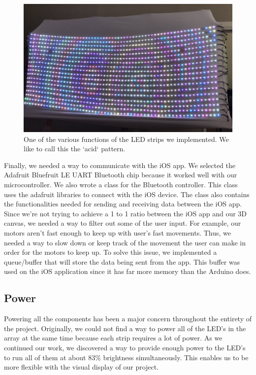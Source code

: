 \documentclass[11pt]{IEEEtran}
\begin{document}
\begin{figure}[H]
  \centering
  \includegraphics[width=\columnwidth]{acid.png}
  \caption{One of the various functions of the LED strips we implemented. We like to call this the `acid` pattern.}
  \label{fig:acid}
\end{figure}

Finally, we needed a way to communicate with the iOS app. We selected the Adafruit Bluefruit LE UART Bluetooth chip because it worked well with our microcontroller. We also wrote a class for the Bluetooth controller. This class uses the adafruit libraries to connect with the iOS device. The class also contains the functionalities needed for sending and receiving data between the iOS app. Since we’re not trying to achieve a 1 to 1 ratio between the iOS app and our 3D canvas, we needed a way to filter out some of the user input. For example, our motors aren’t fast enough to keep up with user’s fast movements. Thus, we needed a way to slow down or keep track of the movement the user can make in order for the motors to keep up. To solve this issue, we implemented a queue/buffer that will store the data being sent from the app. This buffer was used on the iOS application since it has far more memory than the Arduino does.


\subsection{Power}
Powering all the components has been a major concern throughout the entirety of the project. Originally, we could not find a way to power all of the LED’s in the array at the same time because each strip requires a lot of power. As we continued our work, we discovered a way to provide enough power to the LED’s to run all of them at about 83\% brightness simultaneously. This enables us to be more flexible with the visual display of our project. 
\end{document}
